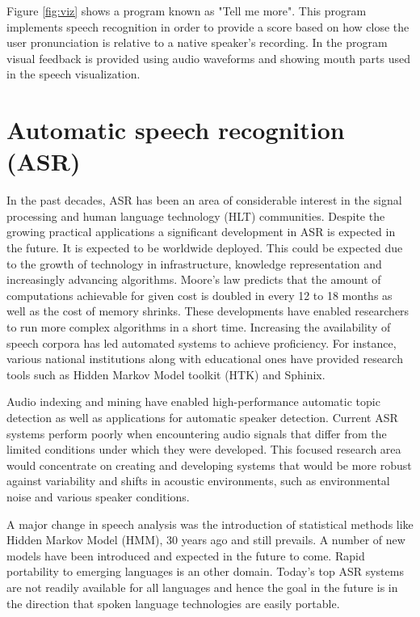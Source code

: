 \documentclass[11pt,a4paper,oneside,article]{memoir}
\begin{document}
Figure \vref{fig:viz} shows a program known as "Tell me more". This program implements speech recognition in order to provide a score based on how close the user pronunciation is relative to a native speaker's recording. In the program visual feedback is provided using audio waveforms and showing mouth parts used in the speech visualization.

\section{Automatic speech recognition (ASR)}
In the past decades, ASR has been an area of considerable interest in the signal processing and human language technology (HLT) communities. Despite the growing practical applications a significant development in ASR is expected in the future. It is expected to be worldwide deployed. This could be expected due to the growth of technology in infrastructure, knowledge representation and increasingly advancing algorithms. Moore's law predicts that the amount of computations achievable for given cost is doubled in every 12 to 18 months as well as the cost of memory shrinks. These developments have enabled researchers to run more complex algorithms in a short time. Increasing the availability of speech corpora has led automated systems to achieve proficiency. For instance, various national institutions along with educational ones have provided research tools such as Hidden Markov Model toolkit (HTK) and Sphinix. \cite{baker}


Audio indexing and mining have enabled high-performance automatic topic detection as well as applications for automatic speaker detection. Current ASR systems perform poorly when encountering audio signals that differ from the limited conditions under which they were developed.
This focused research area would concentrate on creating and developing systems that would be more robust against variability and shifts in acoustic environments, such as environmental noise and various speaker conditions. \cite{baker}

A major change in speech analysis was the introduction of statistical methods like Hidden Markov Model (HMM), 30 years ago and still prevails. A number of new models have been introduced and expected in the future to come.
Rapid portability to emerging languages is an other domain. Today's top ASR systems are not readily available for all languages and hence the goal in the future is in the direction that spoken language technologies are easily portable. \cite{baker}
\end{document}
